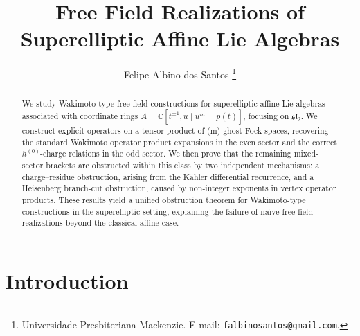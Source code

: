 \documentclass[12pt]{article}
\title{\textbf{Free Field Realizations of Superelliptic Affine Lie Algebras}}
\author{Felipe Albino dos Santos \thanks{Universidade Presbiteriana Mackenzie. E-mail: \texttt{falbinosantos@gmail.com}.}}
\date{}
\theoremstyle{plain}
\theoremstyle{definition}
\theoremstyle{remark}
\begin{document}
\maketitle
\begin{abstract}
We study Wakimoto-type free field constructions for superelliptic affine Lie algebras associated with coordinate rings \(A=\mathbb{C}[t^{\pm1},u \mid u^m = p(t)]\), focusing on \(\mathfrak{sl}_2\). We construct explicit operators on a tensor product of (m) ghost Fock spaces, recovering the standard Wakimoto operator product expansions in the even sector and the correct \(h^{(0)}\)-charge relations in the odd sector. We then prove that the remaining mixed-sector brackets are obstructed within this class by two independent mechanisms: a charge–residue obstruction, arising from the Kähler differential recurrence, and a Heisenberg branch-cut obstruction, caused by non-integer exponents in vertex operator products. These results yield a unified obstruction theorem for Wakimoto-type constructions in the superelliptic setting, explaining the failure of naïve free field realizations beyond the classical affine case.

\end{abstract}
\tableofcontents\bigskip
\section{Introduction}\label{sec:intro}
\end{document}
